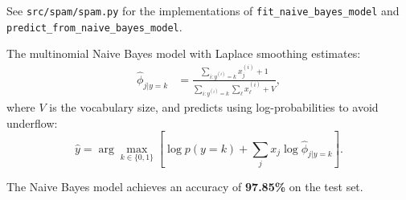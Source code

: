 \begin{answer}
See \texttt{src/spam/spam.py} for the implementations of \texttt{fit\_naive\_bayes\_model} and \texttt{predict\_from\_naive\_bayes\_model}.

The multinomial Naive Bayes model with Laplace smoothing estimates:
\begin{align*}
\hat\phi_{j|y=k} &= \frac{\sum_{i:y^{(i)}=k} x^{(i)}_j + 1}{\sum_{i:y^{(i)}=k}\sum_{\ell} x^{(i)}_\ell + V},
\end{align*}
where $V$ is the vocabulary size, and predicts using log-probabilities to avoid underflow:
$$\hat y = \arg\max_{k\in\{0,1\}} \left[\log p(y=k) + \sum_j x_j \log \hat\phi_{j|y=k}\right].$$

The Naive Bayes model achieves an accuracy of \textbf{97.85\%} on the test set.
\end{answer}
